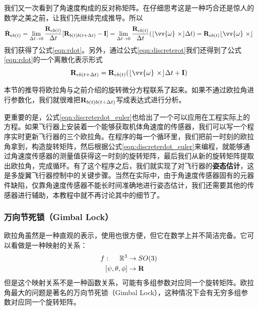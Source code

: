\documentclass[11pt]{article}
\begin{document}
我们又一次看到了角速度构成的反对称矩阵。在仔细思考这是一种巧合还是惊人的数学之美之前，让我们先继续完成推导。所以
$$
\dot{{\bf R}}_{eb(t)} = 
\lim_{\Delta t \to 0}\frac{{\bf R}_{eb(t)}}{\Delta t}[{\bf R}_{b(t)b(t+\Delta t)} - {\bf I}] 
=
\lim_{\Delta t \to 0}\frac{{\bf R}_{eb(t)}}{\Delta t}(\lfloor \vv{\omega} \ \times \rfloor \Delta t)
=
{\bf R}_{eb(t)}\lfloor \vv{\omega} \ \times \rfloor
$$
我们获得了公式\ref{eqn:rdot}。另外，通过公式\ref{eqn:discreterot}我们还得到了公式\ref{eqn:rdot}的一个离散化表示形式
\begin{equation}\label{eqn:discreterdot_euler}
{\bf R}_{eb(t+\Delta t)} = {\bf R}_{eb(t)}(\lfloor \vv{\omega} \ \times \rfloor \Delta t + {\bf I})
\end{equation}

本节的推导将欧拉角与之前介绍的旋转微分方程联系了起来。如果不通过欧拉角进行参数化，我们就很难把${\bf R}_{b(t)b(t+\Delta t)}$写成表达式进行分析。

更重要的是，公式\ref{eqn:discreterdot_euler}也给出了一个可以应用在工程实际上的方程。如果飞行器上安装着一个能够获取机体角速度的传感器，我们可以写一个程序实时更新飞行器的三个欧拉角。在程序的每一个循环里，我们把前一时刻的欧拉角拿到，构造旋转矩阵，然后根据公式\ref{eqn:discreterdot_euler}来编程，就能够通过角速度传感器的测量值获得这一时刻的旋转矩阵，最后我们从新的旋转矩阵提取出欧拉角，完成循环。有了这个程序之后，我们就实现了对飞行器的\textbf{姿态估计}，这是多旋翼飞行器控制中的关键步骤。当然在实际中，由于角速度传感器固有的元器件缺陷，仅靠角速度传感器不能长时间准确地进行姿态估计，我们还需要其他的传感器进行辅助，本教程中就不再讨论其中的细节了。
\subsubsection{万向节死锁（Gimbal Lock）}
欧拉角虽然是一种直观的表示，使用也很方便，但它在数学上并不简洁完备。它可以看做是一种映射的关系：
\begin{align*}
 f: \ \ \ \ \mathbb{R}^3 & \rightarrow SO(3) \\
	[\psi, \theta, \phi] & \rightarrow {\bf R}	
\end{align*}
但是这个映射关系不是一种函数关系，可能有多组参数对应同一个旋转矩阵。欧拉角最大的问题是著名的万向节死锁（Gimbal Lock），这种情况下会有无穷多组参数对应同一个旋转矩阵。
\end{document}
